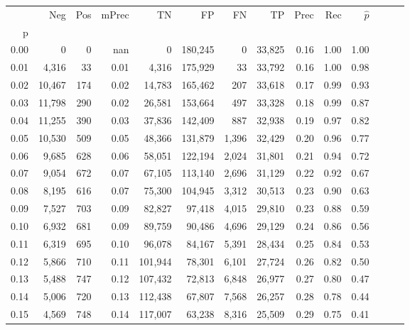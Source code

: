 \begin{tabular}{rrrrrrrrrrrrrr}
\toprule
{} &     Neg &  Pos & mPrec &       TN &       FP &      FN &      TP &  Prec &   Rec & $\hat{p}$ \\
p    &         &      &       &          &          &         &         &       &       &           \\
\midrule
0.00 &       0 &    0 &   nan &        0 &  180,245 &       0 &  33,825 &  0.16 &  1.00 &      1.00 \\
0.01 &   4,316 &   33 &  0.01 &    4,316 &  175,929 &      33 &  33,792 &  0.16 &  1.00 &      0.98 \\
0.02 &  10,467 &  174 &  0.02 &   14,783 &  165,462 &     207 &  33,618 &  0.17 &  0.99 &      0.93 \\
0.03 &  11,798 &  290 &  0.02 &   26,581 &  153,664 &     497 &  33,328 &  0.18 &  0.99 &      0.87 \\
0.04 &  11,255 &  390 &  0.03 &   37,836 &  142,409 &     887 &  32,938 &  0.19 &  0.97 &      0.82 \\
0.05 &  10,530 &  509 &  0.05 &   48,366 &  131,879 &   1,396 &  32,429 &  0.20 &  0.96 &      0.77 \\
0.06 &   9,685 &  628 &  0.06 &   58,051 &  122,194 &   2,024 &  31,801 &  0.21 &  0.94 &      0.72 \\
0.07 &   9,054 &  672 &  0.07 &   67,105 &  113,140 &   2,696 &  31,129 &  0.22 &  0.92 &      0.67 \\
0.08 &   8,195 &  616 &  0.07 &   75,300 &  104,945 &   3,312 &  30,513 &  0.23 &  0.90 &      0.63 \\
0.09 &   7,527 &  703 &  0.09 &   82,827 &   97,418 &   4,015 &  29,810 &  0.23 &  0.88 &      0.59 \\
0.10 &   6,932 &  681 &  0.09 &   89,759 &   90,486 &   4,696 &  29,129 &  0.24 &  0.86 &      0.56 \\
0.11 &   6,319 &  695 &  0.10 &   96,078 &   84,167 &   5,391 &  28,434 &  0.25 &  0.84 &      0.53 \\
0.12 &   5,866 &  710 &  0.11 &  101,944 &   78,301 &   6,101 &  27,724 &  0.26 &  0.82 &      0.50 \\
0.13 &   5,488 &  747 &  0.12 &  107,432 &   72,813 &   6,848 &  26,977 &  0.27 &  0.80 &      0.47 \\
0.14 &   5,006 &  720 &  0.13 &  112,438 &   67,807 &   7,568 &  26,257 &  0.28 &  0.78 &      0.44 \\
0.15 &   4,569 &  748 &  0.14 &  117,007 &   63,238 &   8,316 &  25,509 &  0.29 &  0.75 &      0.41 \\

\end{tabular}
